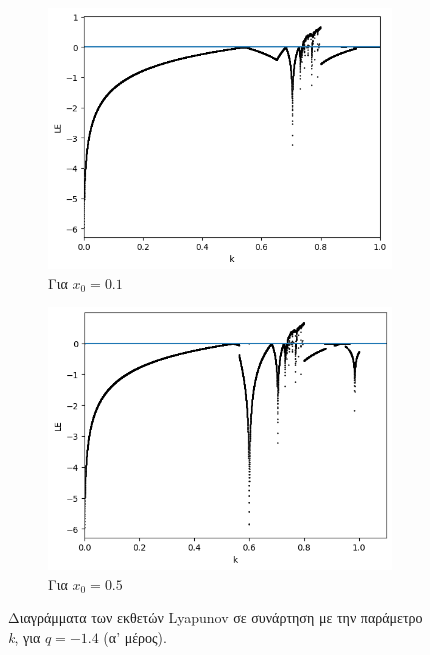 \begin{figure}[ht]
	\centering
	
	\begin{subfigure}[b]{1\textwidth}
		\centering
		\includegraphics[width=\textwidth]{LateX images/graphs q14/g6}
		\caption{Για \(x_0=0.1\)}
		\label{f:g23}
	\end{subfigure}
	\hfill
	\begin{subfigure}[b]{1\textwidth}
		\centering
		\includegraphics[width=\textwidth]{LateX images/graphs q14/g7}
		\caption{Για \(x_0=0.5\)}
		\label{f:g24}
	\end{subfigure}
	\hfill
	\caption{ Διαγράμματα των εκθετών Lyapunov σε συνάρτηση με την παράμετρο \emph{k}, για  $q=-1.4$ (α' μέρος). }
	\label{f:g233}
\end{figure}

